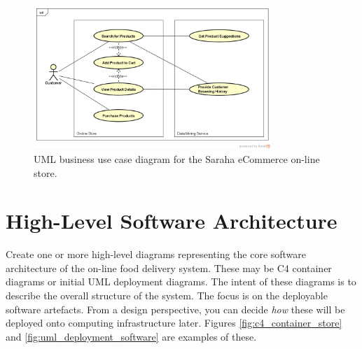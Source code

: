 \documentclass{csse4400}
\begin{document}
\begin{figure}[h!]
    \centering
    \includegraphics[trim=39 38 23 49,clip,width=0.8\textwidth]{images/uml-context.png}
    \caption{UML business use case diagram for the Saraha eCommerce on-line store.}
    \label{fig:uml_context}
\end{figure}



\newpage
\section{High-Level Software Architecture}
Create one or more high-level diagrams representing the core software architecture of the on-line food delivery system.
These may be C4 container diagrams or initial UML deployment diagrams.
The intent of these diagrams is to describe the overall structure of the system.
The focus is on the deployable software artefacts.
From a design perspective, you can decide \emph{how} these will be deployed onto computing infrastructure later.
Figures \ref{fig:c4_container_store} and \ref{fig:uml_deployment_software} are examples of these.
\end{document}
